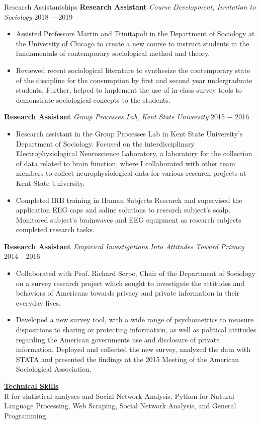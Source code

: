 \documentclass{resume}
\begin{document}
\begin{rSection}{Research Assistantships}
\noindent \textbf{Research Assistant} \textit{Course Development, Invitation to Sociology} \hfill  2018 $-$ 2019
\begin{itemize}[noitemsep,nolistsep,leftmargin=*]
\item { Assisted Professors Martin and Trinitapoli in the Department of Sociology at the University of Chicago to create a new course to instruct students in the fundamentals of contemporary sociological method and theory.}
\item { Reviewed recent sociological literature to synthesize the contemporary state of the discipline for the consumption by first and second year undergraduate students. Further, helped to implement the use of in-class survey tools to demonstrate sociological concepts to the students. \\}
\end{itemize}

\noindent \textbf{Research Assistant} \textit{Group Processes Lab, Kent State University} \hfill  2015 $-$ 2016
\begin{itemize}[noitemsep,nolistsep,leftmargin=*]
\item {Research assistant in the Group Processes Lab in Kent State University’s Department of Sociology. Focused on the interdisciplinary Electrophysiological Neuroscience Laboratory, a laboratory for the collection of data related to brain function, where I collaborated with other team members to collect neurophysiological data for various research projects at Kent State University.}
\item {Completed IRB training in Human Subjects Research and supervised the application EEG caps and saline solutions to research subject's scalp. Monitored subject's brainwaves and EEG equipment as research subjects completed research tasks.\\}
\end{itemize}

\noindent \textbf{Research Assistant} \textit{Empirical Investigations Into Attitudes Toward Privacy} \hfill 2014$-$ 2016
\begin{itemize}[noitemsep,nolistsep,leftmargin=*]
\item {Collaborated with Prof. Richard Serpe, Chair of the Department of Sociology on a survey research project which sought to investigate the attitudes and behaviors of Americans towards privacy and private information in their everyday lives.}
\item {Developed a new survey tool, with a wide range of psychometrics to measure dispositions to sharing or protecting information, as well as political attitudes regarding the American governments use and disclosure of private information. Deployed and collected the new survey, analyzed the data with STATA and presented the findings at the 2015 Meeting of the American Sociological Association. \\}
\end{itemize}

\end{rSection}


\noindent \textbf{\underline{Technical Skills}} \\
\noindent R for statistical analyses and Social Network Analysis. Python for Natural Language Processing, Web Scraping, Social Network Analysis, and General Programming. \\
\end{document}
